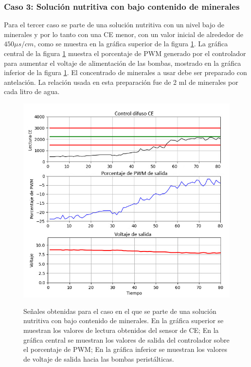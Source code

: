 \subsubsection{Caso 3: Solución nutritiva con bajo contenido de minerales}

Para el tercer caso se parte de una solución nutritiva con un nivel bajo de minerales y por lo tanto con una CE menor, con un valor inicial de alrededor de $450 \mu s/cm$, como se muestra en la gráfica superior de la figura \ref{CEMenos}. La gráfica central de la figura \ref{CEMenos} muestra el porcentaje de PWM generado por el controlador para aumentar el voltaje de alimentación de las bombas, mostrado en la gráfica inferior de la figura \ref{CEMenos}. El concentrado de minerales a usar debe ser preparado con antelación. La relación usada en esta preparación fue de 2 ml de minerales por cada litro de agua. 
\begin{figure}[H]
\centering
         \includegraphics[scale=0.75]{imgs/CEMenos.png} \\
    \caption{Señales obtenidas para el caso en el que se parte de una solución nutritiva con bajo contenido de minerales. En la gráfica superior se muestran los valores de lectura obtenidos del sensor de CE; En la gráfica central se muestran los valores de salida del controlador sobre el porcentaje de PWM; En la gráfica inferior se muestran los valores de voltaje de salida hacia las bombas peristálticas.}\label{CEMenos}
\end{figure}
